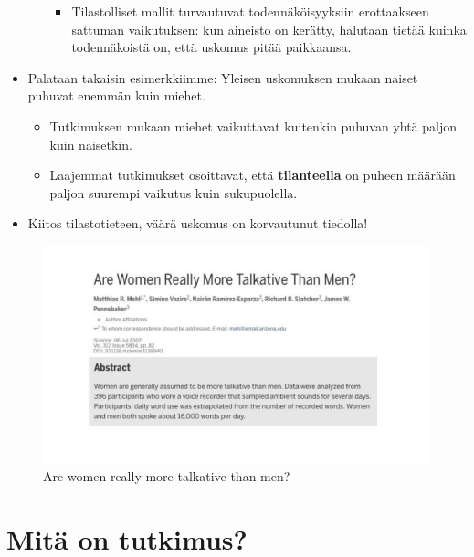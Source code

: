 \documentclass[
]{book}
\providecommand{\tightlist}{%
  \setlength{\itemsep}{0pt}\setlength{\parskip}{0pt}}
\begin{document}
\begin{eblock}{}
\begin{itemize}
\begin{itemize}
    \begin{itemize}
    \tightlist
    \item
      Tilastolliset mallit turvautuvat todennäköisyyksiin erottaakseen sattuman vaikutuksen: kun aineisto on kerätty, halutaan tietää kuinka todennäkoistä on, että uskomus pitää paikkaansa.
    \end{itemize}
  \end{itemize}
\item
  Palataan takaisin esimerkkiimme: Yleisen uskomuksen mukaan naiset puhuvat enemmän kuin miehet.

  \begin{itemize}
  \tightlist
  \item
    Tutkimuksen mukaan miehet vaikuttavat kuitenkin puhuvan yhtä paljon kuin naisetkin.
  \item
    Laajemmat tutkimukset osoittavat, että \textbf{tilanteella} on puheen määrään paljon suurempi vaikutus kuin sukupuolella.
  \end{itemize}
\item
  Kiitos tilastotieteen, väärä uskomus on korvautunut tiedolla!
\end{itemize}

\end{eblock}

\begin{figure}

{\centering \includegraphics[width=1\linewidth]{images/Are-women-really-more-talkative} 

}

\caption{Are women really more talkative than men?}\label{fig:talkative}
\end{figure}

\hypertarget{alaluku24}{%
\section{Mitä on tutkimus?}\label{alaluku24}}
\end{document}
